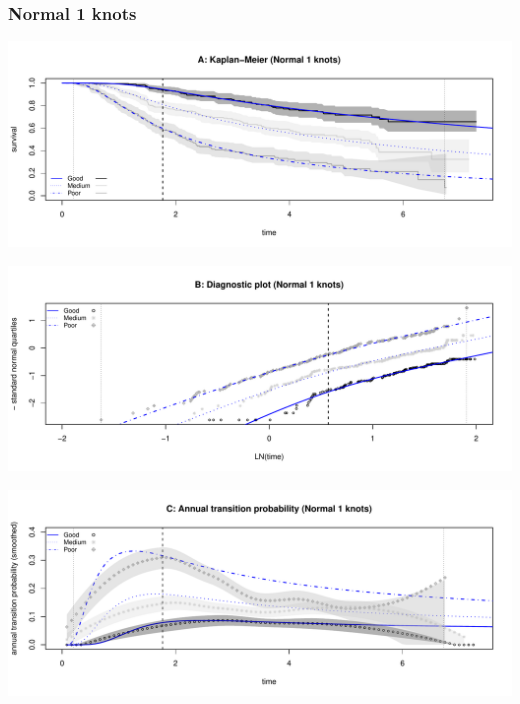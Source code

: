 \documentclass[
]{article}
\begin{document}
\clearpage

\subsubsection{Normal 1 knots}\label{normal-1-knots}

\begin{flushleft}\includegraphics[height=0.25\textheight]{BC_OS_output/Images/Figure_spline_models-19} \end{flushleft}

\begin{flushleft}\includegraphics[height=0.25\textheight]{BC_OS_output/Images/Figure_spline_models-20} \end{flushleft}

\begin{flushleft}\includegraphics[height=0.25\textheight]{BC_OS_output/Images/Figure_spline_models-21} \end{flushleft}
\end{document}
